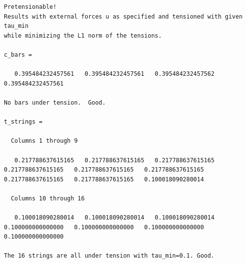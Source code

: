 \documentclass{article}
\begin{document}
\begin{lstlisting}[caption={Ouput of NonminimalPrism4.m with equal tensions across vertical and diagonal strings},captionpos=t, label={lst:p2b}]
Pretensionable!
Results with external forces u as specified and tensioned with given tau_min
while minimizing the L1 norm of the tensions.

c_bars =

   0.395484232457561   0.395484232457561   0.395484232457562   0.395484232457561

No bars under tension.  Good.

t_strings =

  Columns 1 through 9

   0.217788637615165   0.217788637615165   0.217788637615165   0.217788637615165   0.217788637615165   0.217788637615165   0.217788637615165   0.217788637615165   0.100018090280014

  Columns 10 through 16

   0.100018090280014   0.100018090280014   0.100018090280014   0.100000000000000   0.100000000000000   0.100000000000000   0.100000000000000

The 16 strings are all under tension with tau_min=0.1. Good.
\end{lstlisting}



\end{document}
